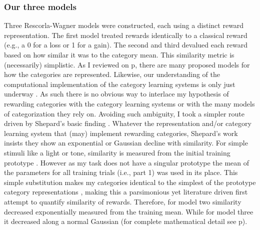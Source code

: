 \documentclass[doc,12pt]{apa}        %
\begin{document}
\subsubsection{Our three models}
\label{subsub:catquant}
Three Rescorla-Wagner models were constructed, each using a distinct reward representation.  The first model treated rewards identically to a classical reward (e.g., a 0 for a loss or 1 for a gain).  The second and third devalued each reward based on how similar it was to the category mean.  This similarity metric is (necessarily) simplistic.  As I reviewed on p\pageref{subsub:curves}, there are many proposed models for how the categories are represented.  Likewise, our understanding of the computational implementation of the category learning systems is only just underway \cite{Ashby:2005p9152,Ashby:2006p9153}.  As such there is no obvious way to interlace my hypothesis of rewarding categories with the category learning systems or with the many models of categorization they rely on.  Avoiding such ambiguity, I took a simpler route driven by Shepard's basic finding \cite{Shepard:1987p9102}.  Whatever the representation and/or category learning system that (may) implement rewarding categories, Shepard's work insists they show an exponential or Gaussian decline with similarity.  For simple stimuli like a light or tone, similarity is measured from the initial training prototype \cite{Guttman:1956p8355}.  However as my task does not have a singular prototype the mean of the parameters for all training trials (i.e., part 1) was used in its place.  This simple substitution makes my categories identical to the simplest of the prototype category representations \cite{Rosch:1973p9108,Ashby:1995p9109}, making this a parsimonious yet literature driven first attempt to quantify similarity of rewards.  Therefore, for model two similarity decreased exponentially measured from the training mean.  While for model three it decreased along a normal Gaussian (for complete mathematical detail see p\pageref{subsub:codesandfits}).  
\end{document}
